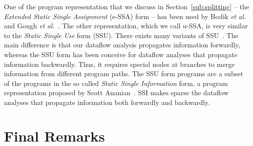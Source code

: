 \documentclass[preprint]{sigplanconf}[10pt]
\begin{document}
One of the program representation that we discuss in
Section~\ref{sub:splitting} -- the {\em
Extended Static Single Assignment} (e-SSA) form -- has been used by Bodik
{\em et al.}~\cite{Bodik00} and Gough {\em et al.}~\cite{Gough94}.
The other representation, which we call u-SSA, is very similar to
the \emph{Static Single Use} form (SSU).
There exists many variants of SSU~\cite{Plevyak96,George03,Lo98}.
The main difference is that our dataflow analysis propagates information
forwardly, whereas the SSU form has been conceive for dataflow analyses
that propagate information backwardly.
Thus, it requires special nodes at branches to merge information from
different program paths.
The SSU form programs are a subset of the programs in the so called
{\em Static Single Information} form, a program representation proposed by
Scott Ananian~\cite{Ananian99}.
SSI makes sparse the dataflow analyses that propagate information both
forwardly and backwardly.

\section{Final Remarks}
\label{sec:rem}



\end{document}
